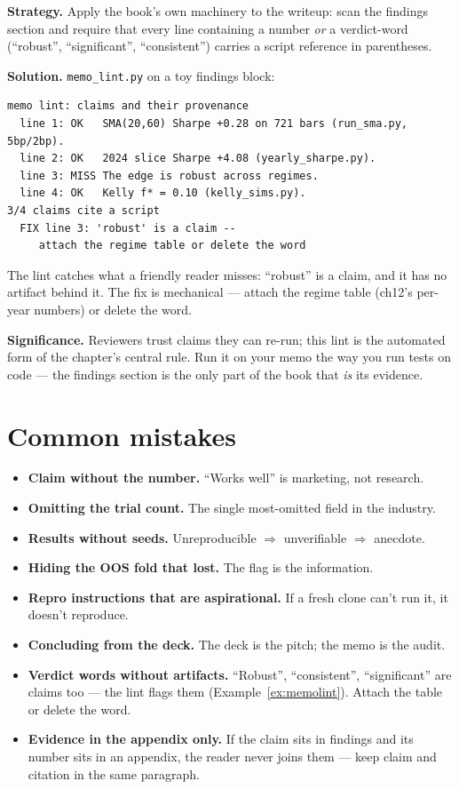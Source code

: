 \begin{example}\label{ex:memolint}
\textbf{Strategy.} Apply the book's own machinery to the writeup:
scan the findings section and require that every line containing a
number \emph{or} a verdict-word (``robust'', ``significant'',
``consistent'') carries a script reference in parentheses.

\textbf{Solution.} \texttt{memo\_lint.py} on a toy findings block:
\begin{verbatim}
memo lint: claims and their provenance
  line 1: OK   SMA(20,60) Sharpe +0.28 on 721 bars (run_sma.py, 5bp/2bp).
  line 2: OK   2024 slice Sharpe +4.08 (yearly_sharpe.py).
  line 3: MISS The edge is robust across regimes.
  line 4: OK   Kelly f* = 0.10 (kelly_sims.py).
3/4 claims cite a script
  FIX line 3: 'robust' is a claim --
     attach the regime table or delete the word
\end{verbatim}
The lint catches what a friendly reader misses: ``robust'' is a
claim, and it has no artifact behind it. The fix is mechanical ---
attach the regime table (ch12's per-year numbers) or delete the
word.

\textbf{Significance.} Reviewers trust claims they can re-run;
this lint is the automated form of the chapter's central rule.
Run it on your memo the way you run tests on code --- the findings
section is the only part of the book that \emph{is} its evidence.
\end{example}

\section{Common mistakes}
\begin{itemize}
\item \textbf{Claim without the number.} ``Works well'' is marketing, not research.
\item \textbf{Omitting the trial count.} The single most-omitted field in the industry.
\item \textbf{Results without seeds.} Unreproducible $\Rightarrow$ unverifiable
  $\Rightarrow$ anecdote.
\item \textbf{Hiding the OOS fold that lost.} The flag is the information.
\item \textbf{Repro instructions that are aspirational.} If a fresh clone can't run it,
  it doesn't reproduce.
\item \textbf{Concluding from the deck.} The deck is the pitch; the memo is the audit.
\item \textbf{Verdict words without artifacts.}
``Robust'', ``consistent'', ``significant'' are claims too ---
the lint flags them (Example~\ref{ex:memolint}). Attach the
table or delete the word.
\item \textbf{Evidence in the appendix only.} If the claim sits
in findings and its number sits in an appendix, the reader never
joins them --- keep claim and citation in the same paragraph.\end{itemize}

